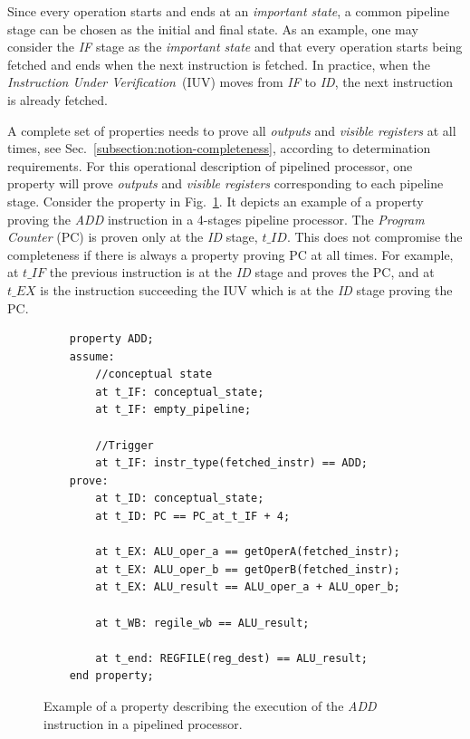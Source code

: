Since every operation starts and ends at an \textit{important state}, a common pipeline stage can be chosen as the initial and final state. As an example, one may consider the \textit{IF} stage as the \textit{important state} and that every operation starts being fetched and ends when the next instruction is fetched. In practice, when the \textit{Instruction Under Verification}~(IUV) moves from \textit{IF} to \textit{ID}, the next instruction is already fetched.

A complete set of properties needs to prove all \textit{outputs} and \textit{visible registers} at all times, see Sec.~\ref{subsection:notion-completeness}, according to determination requirements. For this operational description of pipelined processor, one property will prove \textit{outputs} and \textit{visible registers} corresponding to each pipeline stage. Consider the property in Fig.~\ref{fig:ex-add-ppt}. It depicts an example of a property proving the \textit{ADD} instruction in a 4-stages pipeline processor. The \textit{Program Counter} (PC) is proven only at the \textit{ID} stage, $t\_ID$. This does not compromise the completeness if there is always a property proving PC at all times. For example, at $t\_IF$ the previous instruction is at the \textit{ID} stage and proves the PC, and at $t\_EX$ is the instruction succeeding the IUV which is at the \textit{ID} stage proving the PC.

\begin{figure}[htb!]
    \begin{lstlisting}
    property ADD;
    assume:
        //conceptual state
        at t_IF: conceptual_state;
        at t_IF: empty_pipeline;
    
        //Trigger
        at t_IF: instr_type(fetched_instr) == ADD;
    prove:
        at t_ID: conceptual_state;
        at t_ID: PC == PC_at_t_IF + 4;
    
        at t_EX: ALU_oper_a == getOperA(fetched_instr);
        at t_EX: ALU_oper_b == getOperB(fetched_instr);
        at t_EX: ALU_result == ALU_oper_a + ALU_oper_b;
        
        at t_WB: regile_wb == ALU_result;
    
        at t_end: REGFILE(reg_dest) == ALU_result;
    end property;\end{lstlisting}
    \caption{Example of a property describing the execution of the \textit{ADD} instruction in a pipelined processor.}
    \label{fig:ex-add-ppt}
\end{figure}

